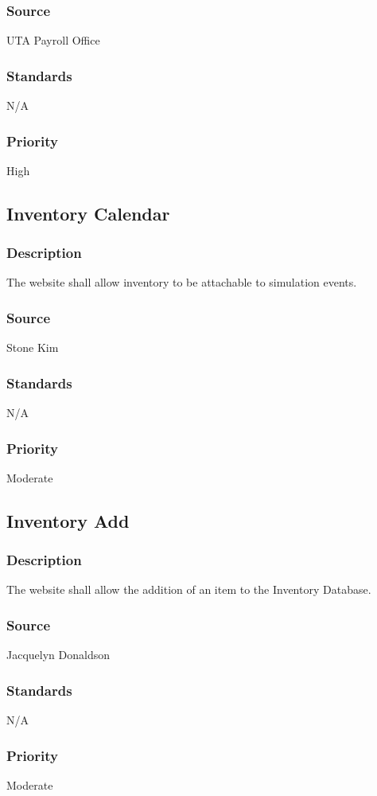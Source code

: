\subsubsection{Source}
UTA Payroll Office
\subsubsection{Standards}
N/A
\subsubsection{Priority}
High

\subsection{Inventory Calendar}
\subsubsection{Description}
The website shall allow inventory to be attachable to simulation events.
\subsubsection{Source}
Stone Kim
\subsubsection{Standards}
N/A
\subsubsection{Priority}
Moderate

\subsection{Inventory Add}
\subsubsection{Description}
The website shall allow the addition of an item to the Inventory Database.
\subsubsection{Source}
Jacquelyn Donaldson
\subsubsection{Standards}
N/A
\subsubsection{Priority}
Moderate

